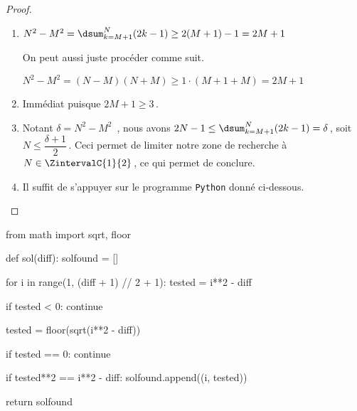 \begin{proof}
	\leavevmode
	
	\vspace{-1ex}
	\begin{enumerate}
		\item $N^2 - M^2 = \dsum_{k=M+1}^{N} (2 k - 1) \geq 2(M + 1) - 1 = 2M + 1$
		
		\smallskip
		\noindent
		On peut aussi juste procéder comme suit. 
		
		\smallskip
		\noindent
		$N^2 - M^2 = (N - M)(N + M) \geq 1 \cdot (M + 1 + M) = 2M + 1$


		\item Immédiat puisque $2M + 1 \geq 3$\,.


		\item Notant $\delta = N^2 - M^2$ \,, nous avons $2 N - 1 \leq \dsum_{k=M+1}^{N} (2 k - 1) = \delta$\,, soit $N  \leq \dfrac{\delta + 1}{2}$\,.
		Ceci permet de limiter notre zone de recherche à $N \in \ZintervalC{1}{2}$\,, ce qui permet de conclure.
		

		\item Il suffit de s'appuyer sur le programme \verb#Python# donné ci-dessous.
		\qedhere
	\end{enumerate}
\end{proof}


\begin{Python}
from math import sqrt, floor

def sol(diff):
    solfound = []

    for i in range(1, (diff + 1) // 2 + 1):
        tested = i**2 - diff

        if tested < 0:
            continue

        tested = floor(sqrt(i**2 - diff))

        if tested == 0:
            continue

        if tested**2 == i**2 - diff:
            solfound.append((i, tested))

    return solfound
\end{Python}

